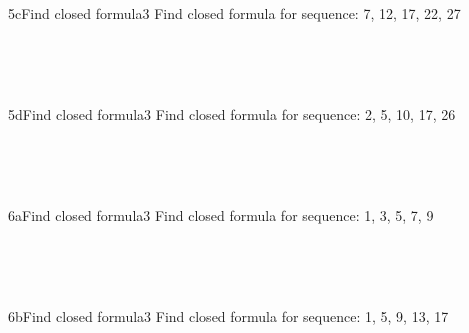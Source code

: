 \documentclass[a4paper,12pt]{book}
\begin{document}
    ~\\
    
    \hrulefill
    
    ~\\
    \begin{answersheetquestion}{5c}{Find closed formula}{3}
        Find closed formula for sequence: 7, 12, 17, 22, 27
        \iftoggle{answerkey}{ \begin{answer} $a_{n} = 5n+2$ \end{answer} }{ { ~\\ \raisebox{0pt}[2cm][0pt]{  } } }
    \end{answersheetquestion}
    
    ~\\
    
    \hrulefill
    
    ~\\
    \begin{answersheetquestion}{5d}{Find closed formula}{3}
        Find closed formula for sequence: 2, 5, 10, 17, 26
        \iftoggle{answerkey}{ \begin{answer} $a_{n} = n^{2} + 1$ \end{answer} }{ { ~\\ \raisebox{0pt}[2cm][0pt]{  } } }
    \end{answersheetquestion}

    ~\\
    
    \hrulefill
    
    ~\\
    \begin{answersheetquestion}{6a}{Find closed formula}{3}
        Find closed formula for sequence: 1, 3, 5, 7, 9
        \iftoggle{answerkey}{ \begin{answer} $a_{n} = a_{n-1} + 2$ \end{answer} }{ { ~\\ \raisebox{0pt}[2cm][0pt]{  } } }
    \end{answersheetquestion}

    ~\\
    
    \hrulefill
    
    ~\\
    \begin{answersheetquestion}{6b}{Find closed formula}{3}
        Find closed formula for sequence: 1, 5, 9, 13, 17
        \iftoggle{answerkey}{ \begin{answer} $a_{n} = a_{n-1} + 4$ \end{answer} }{ { ~\\ \raisebox{0pt}[2cm][0pt]{  } } }
    \end{answersheetquestion}
\end{document}

